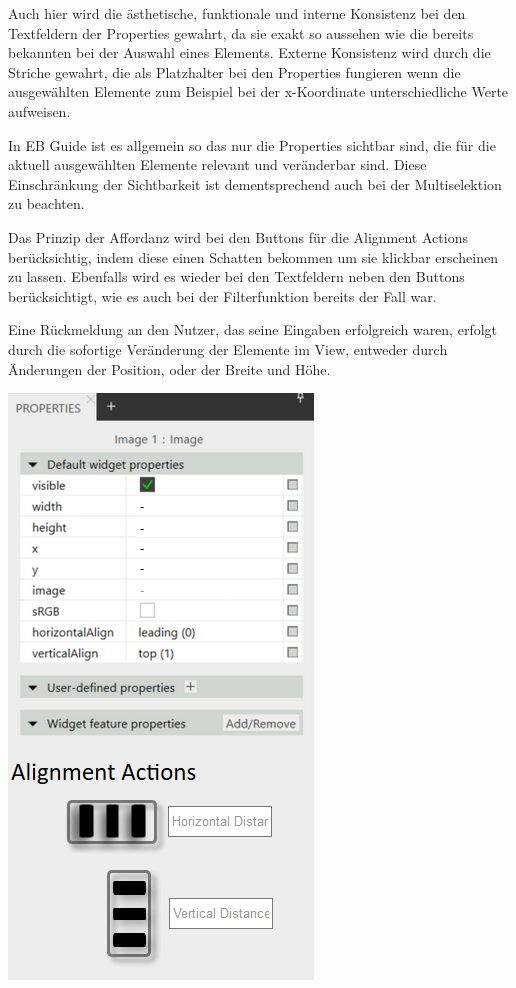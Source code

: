 Auch hier wird die ästhetische, funktionale und interne Konsistenz bei den Textfeldern der Properties gewahrt, da sie exakt so aussehen wie die bereits bekannten bei der Auswahl eines Elements.
Externe Konsistenz wird durch die Striche gewahrt, die als Platzhalter bei den Properties fungieren wenn die ausgewählten Elemente zum Beispiel bei der x-Koordinate unterschiedliche Werte aufweisen.

In EB Guide ist es allgemein so das nur die Properties sichtbar sind, die für die aktuell ausgewählten Elemente relevant und veränderbar sind.
Diese Einschränkung der Sichtbarkeit ist dementsprechend auch bei der Multiselektion zu beachten.

Das Prinzip der Affordanz  wird bei den Buttons für die Alignment Actions berücksichtig, indem diese einen Schatten bekommen um sie klickbar erscheinen zu lassen.
Ebenfalls wird es wieder bei den Textfeldern neben den Buttons berücksichtigt, wie es auch bei der Filterfunktion bereits der Fall war.

Eine Rückmeldung  an den Nutzer, das seine Eingaben erfolgreich waren, erfolgt durch die sofortige Veränderung der Elemente im View, entweder durch Änderungen der Position, oder der Breite und Höhe.

\begin{center}
  \includegraphics[scale=0.8]{figures/Mehrfachselektion_Adaption02.png}
  \label{fig:Mehrfachselektion_Adaption}
\end{center}

